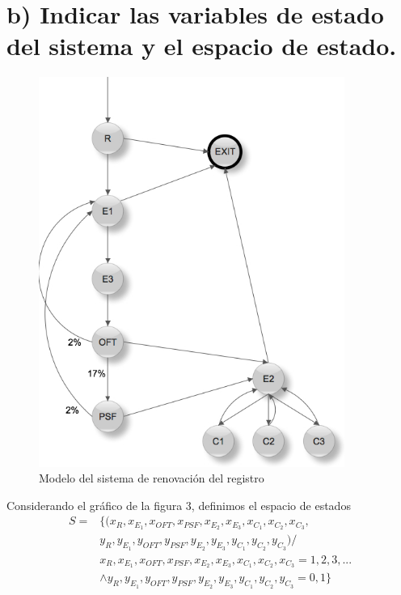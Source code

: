 \documentclass{article}
\numberwithin{equation}{section}
\numberwithin{figure}{section}
\numberwithin{table}{section}
\begin{document}
\section*{b) Indicar las variables de estado del sistema y el espacio de estado.}

\begin{figure}
\begin{center}
\includegraphics[width=10cm]{automata.jpeg}
\caption{Modelo del sistema de renovaci\'on del registro}
	\end{center}
\end{figure}

Considerando el gr\'afico de la figura 3,  definimos el espacio de estados
\begin{align*}
 S =& \{ ( x_R, x_{E_1}, x_{OFT}, x_ {PSF}, x_{E_2}, x_{E_3}, x_{C_1}, x_{C_2}, x_{C_3}, \\
&y_R, y_{E_1}, y_{OFT}, y_ {PSF}, y_{E_2}, y_{E_3}, y_{C_1}, y_{C_2}, y_{C_3} ) / \\
& x_R, x_{E_1}, x_{OFT}, x_ {PSF}, x_{E_2}, x_{E_3}, x_{C_1}, x_{C_2}, x_{C_3} = 1, 2, 3, ...\\
    & \wedge y_R, y_{E_1}, y_{OFT}, y_ {PSF}, y_{E_2}, y_{E_3}, y_{C_1}, y_{C_2}, y_{C_3} =  0, 1  \}
\end{align*}
\end{document}
